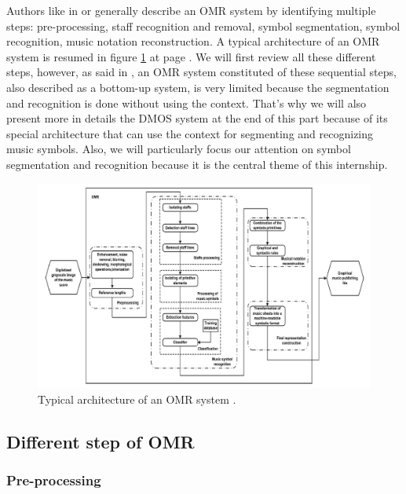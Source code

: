 \documentclass[11pt]{sdm}
\begin{document}
Authors like in \cite{rebelo_optical_2012} or \cite{fornes_analysis_2014} generally describe an OMR system by identifying multiple steps: pre-processing, staff recognition and removal, symbol segmentation, symbol recognition, music notation reconstruction.
A typical architecture of an OMR system is resumed in figure \ref{typical_omr} at page \pageref{typical_omr}.
We will first review all these different steps, however, as said in \cite{couasnon_way_1995}, an OMR system constituted of these sequential steps, also described as a bottom-up system, is very limited because the segmentation and recognition is done without using the context.
That's why we will also present more in details the DMOS system at the end of this part because of its special architecture that can use the context for segmenting and recognizing music symbols.
Also, we will particularly focus our attention on symbol segmentation and recognition because it is the central theme of this internship.
\begin{figure}[btp]
  \centering
  \includegraphics[scale=0.8]{img/typical_omr}
  \caption{\label{typical_omr} Typical architecture of an OMR system \cite{rebelo_optical_2012}. }
\end{figure}

\subsection{Different step of OMR} \label{ssec:omr_steps}

\subsubsection{Pre-processing}
\end{document}
